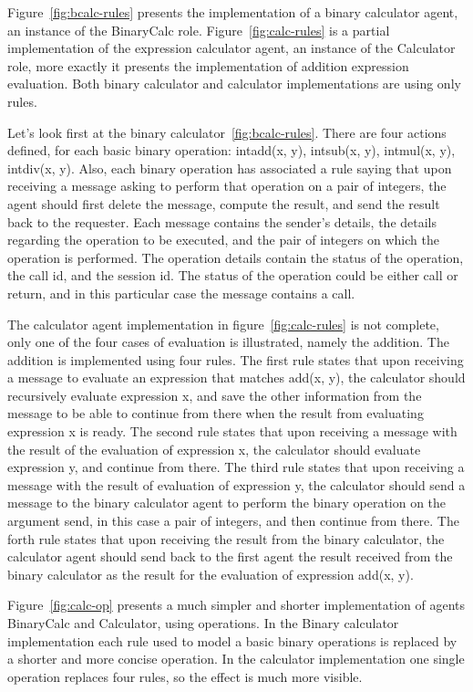 \documentclass[a4paper,12pt,oneside,fleqn]{book} %
\begin{document}
Figure~\ref{fig:bcalc-rules} presents the implementation of a binary
calculator agent, an instance of the BinaryCalc role.
Figure~\ref{fig:calc-rules} is a partial implementation of the expression
calculator agent, an instance of the Calculator role, more exactly it
presents the implementation of addition expression evaluation. Both binary
calculator and calculator implementations are using only rules.

Let's look first at the binary calculator~\ref{fig:bcalc-rules}. There are
four actions defined, for each basic binary operation: intadd(x, y),
intsub(x, y), intmul(x, y), intdiv(x, y). Also, each binary operation has
associated a rule saying that upon receiving a message asking to perform
that operation on a pair of integers, the agent should first delete the
message, compute the result, and send the result back to the requester.
Each message contains the sender's details, the details regarding the
operation to be executed, and the pair of integers on which the operation
is performed. The operation details contain the status of the operation,
the call id, and the session id. The status of the operation could be
either call or return, and in this particular case the message contains a
call.

The calculator agent implementation in figure~\ref{fig:calc-rules} is not
complete, only one of the four cases of evaluation is illustrated, namely
the addition. The addition is implemented using four rules. The first rule
states that upon receiving a message to evaluate an expression that matches
add(x, y), the calculator should recursively evaluate expression x, and save
the other information from the message to be able to continue from there when
the result from evaluating expression x is ready. The second rule states
that upon receiving a message with the result of the evaluation of
expression x, the calculator should evaluate expression y, and continue
from there. The third rule states that upon receiving a message with the
result of evaluation of expression y, the calculator should send a message
to the binary calculator agent to perform the binary operation on the
argument send, in this case a pair of integers, and then continue from
there. The forth rule states that upon receiving the result from the
binary calculator, the calculator agent should send back to the first agent
the result received from the binary calculator as the result for the
evaluation of expression add(x, y).

Figure~\ref{fig:calc-op} presents a much simpler and shorter implementation
of agents BinaryCalc and Calculator, using operations. In the Binary
calculator implementation each rule used to model a basic binary operations
is replaced by a shorter and more concise operation. In the calculator
implementation one single operation replaces four rules, so the effect is
much more visible.
\end{document}
